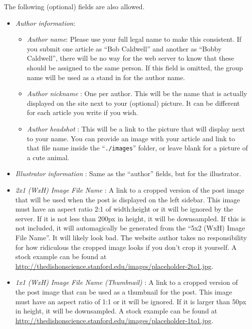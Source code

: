 \documentclass[paper=a4, fontsize=11pt]{scrartcl}
\numberwithin{equation}{section}        %
\numberwithin{figure}{section}            %
\numberwithin{table}{section}                %
\newcommand{\dishurlplain}[1]{http://thedishonscience.stanford.edu/#1}
\newcommand{\dishurl}[1]{\url{\dishurlplain{#1}}}
\begin{document}
\noindent{}The following (optional) fields are also allowed.
\begin{itemize}
    \item \emph{Author information}:
        \begin{itemize}
            \item \emph{Author name}: Please use your full legal name to make this consistent. If
                you submit one article as ``Bob Caldwell'' and another as ``Bobby
                Caldwell'', there will be no way for the web server to know that
                these should be assigned to the same person.
                If this field is omitted, the group name will be used as a stand in for
                the author name.
            \item \emph{Author nickname} : One per author. This will be the name that is
                actually displayed on the site next to your (optional) picture. It can
                be different for each article you write if you wish.
            \item \emph{Author headshot} : This will be a link to the picture
                that will display next to your name.  You can provide an image
                with your article and link to that file name inside the
                ``\texttt{./images}'' folder, or leave blank for a picture of a
                cute animal.
        \end{itemize}
    \item \emph{Illustrator information} : Same as
        the ``author'' fields, but for the illustrator.
    \item \emph{2x1 (WxH) Image File Name} : A link to a cropped version of the post image that
        will be used when the post is displayed on the left sidebar. This image
        must have an aspect ratio 2:1 of width:height or it will be ignored by
        the server. If it is not less than
        200px in height, it will be downsampled. If this is not included, it
        will automagically be generated from the ``5x2 (WxH) Image File Name''.
        It will likely look bad. The website author takes no responsibility for
        how ridiculous the cropped image looks if you don't crop it yourself. A stock
        example can be found at
        \dishurl{images/placeholder-2to1.jpg}.
    \item \emph{1x1 (WxH) Image File Name (Thumbnail)} : A link to a cropped version of the post image
        that can be used as a thumbnail for the post. This image must have an
        aspect ratio of 1:1 or it will be ignored. If it is larger than 50px in
        height, it will be downsampled. A stock
        example can be found at
        \dishurl{images/placeholder-1to1.jpg}.

\end{itemize}
\end{document}
